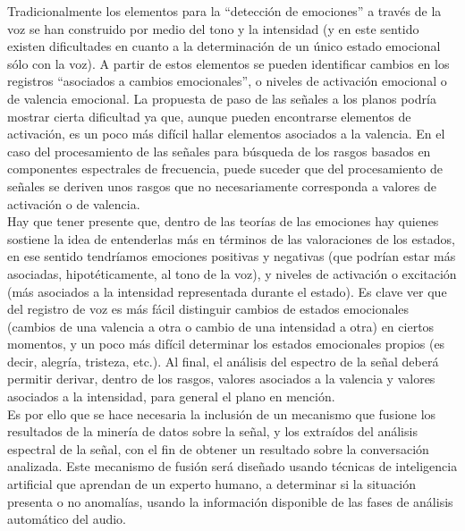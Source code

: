\documentclass[11pt,lettersize]{article} %
\begin{document}
Tradicionalmente los elementos para la ``detección de emociones'' a través de la voz se han construido por medio del tono y la intensidad (y en este sentido existen dificultades en cuanto a la determinación de un único estado emocional sólo con la voz). A partir de estos elementos se pueden identificar cambios en los registros ``asociados a cambios emocionales'', o niveles de activación emocional o de valencia emocional. La propuesta de paso de las señales a los planos podría mostrar cierta dificultad ya que, aunque pueden encontrarse elementos de activación, es un poco más difícil hallar elementos asociados a la valencia. En el caso del procesamiento de las señales para búsqueda de los rasgos basados en componentes espectrales de frecuencia, puede suceder que del procesamiento de señales se deriven unos rasgos que no necesariamente corresponda a valores de activación o de valencia. \\

Hay que tener presente que, dentro de las teorías de las emociones hay quienes sostiene la idea de entenderlas más en términos de las valoraciones de los estados, en ese sentido tendríamos emociones positivas y negativas (que podrían estar más asociadas, hipotéticamente, al tono de la voz), y niveles de activación o excitación (más asociados a la intensidad representada durante el estado). Es clave ver que del registro de voz es más fácil distinguir cambios de estados emocionales (cambios de una valencia a otra o cambio de una intensidad a otra) en ciertos momentos, y un poco más difícil determinar los estados emocionales propios (es decir, alegría, tristeza, etc.). Al final, el análisis del espectro de la señal deberá permitir derivar, dentro de los rasgos, valores asociados a la valencia y valores asociados a la intensidad, para general el plano en mención.\\

Es por ello que se hace necesaria la inclusión de un mecanismo que fusione los resultados de la minería de datos sobre la señal, y los extraídos del análisis espectral de la señal, con el fin de obtener un resultado sobre la conversación analizada. Este mecanismo de fusión será diseñado usando técnicas de inteligencia artificial que aprendan de un experto humano, a determinar si la situación presenta o no anomalías, usando la información disponible de las fases de análisis automático del audio.\\
\end{document}
